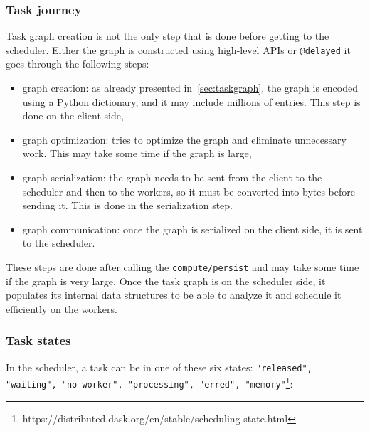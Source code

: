 \subsubsection{Task journey}\label{sec:taskjourney}
Task graph creation is not the only step that is done before getting to the scheduler.
Either the graph is constructed using high-level APIs or \texttt{@delayed} it goes through the following steps:
\begin{itemize}
    \item graph creation: as already presented in~\ref{sec:taskgraph}, the graph is encoded using a Python dictionary, and it may include millions of entries. This step is done on the client side, 
    \item graph optimization: \dask tries to optimize the graph and eliminate unnecessary work. This may take some time if the graph is large,
    \item graph serialization: the graph needs to be sent from the client to the scheduler and then to the workers, so it must be converted into bytes before sending it. This is done in the serialization step. 
    \item graph communication: once the graph is serialized on the client side, it is sent to the scheduler.
\end{itemize}
These steps are done after calling the \texttt{compute/persist} and may take some time if the graph is very large. 
Once the task graph is on the scheduler side, it populates its internal data structures to be able to analyze it and schedule it efficiently on the workers.

\subsubsection{Task states}\label{sec:taskstate}
In the \dask scheduler, a task can be in one of these six states: \texttt{"released", "waiting", "no-worker", "processing", "erred", "memory"}\footnote{https://distributed.dask.org/en/stable/scheduling-state.html}:

